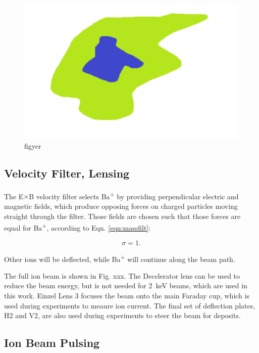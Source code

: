 \begin{figure}[H]
        \centering
                \includegraphics[width=.9\textwidth]{figures/figer.png}
                \caption{figyer}
\label{fig:testfig}
\end{figure}

\subsection{Velocity Filter, Lensing}

The E$\times$B velocity filter selects Ba\textsuperscript{+} by providing perpendicular electric and magnetic fields, which produce opposing forces on charged particles moving straight through the filter.  Those fields are chosen such that those forces are equal for Ba\textsuperscript{+}, according to Eqn. \ref{eqn:massfilt}:

\begin{equation}
\sigma = 1.
\label{eqn:massfilt}
\end{equation}

\noindent
Other ions will be deflected, while Ba\textsuperscript{+} will continue along the beam path.

The full ion beam is shown in Fig. xxx.  The Decelerator lens can be used to reduce the beam energy, but is not needed for 2~keV beams, which are used in this work.  Einzel Lens 3 focuses the beam onto the main Faraday cup, which is used during experiments to meaure ion current.  The final set of deflection plates, H2 and V2, are also used during experiments to steer the beam for deposits.

\subsection{Ion Beam Pulsing}


